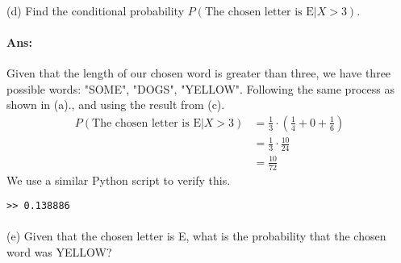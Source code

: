 \documentclass{article}
\begin{document}
\begin{enumerate}
\paragraph{}(d) Find the conditional probability $P(\text{The chosen letter is E} |X > 3)$.
\paragraph{Ans:}Given that the length of our chosen word is greater than three, we have three possible words:
"SOME", "DOGS", "YELLOW". Following the same process as shown in (a)., and using the result from (c).
\begin{align*}
    P(\text{The chosen letter is E} |X > 3) &= \frac{1}{3} \cdot (\frac{1}{4}+0+\frac{1}{6})\\
                                            &= \frac{1}{3} \cdot \frac{10}{24}\\
                                            &= \frac{10}{72}
\end{align*}
We use a similar Python script to verify this.
\begin{verbatim}
>> 0.138886
\end{verbatim}

\paragraph{}(e) Given that the chosen letter is E, what is the probability that the chosen word was
YELLOW?

\end{enumerate}
\end{document}
